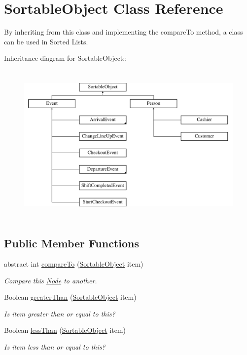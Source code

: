 \hypertarget{class_sortable_object}{
\section{SortableObject Class Reference}
\label{class_sortable_object}
}
By inheriting from this class and implementing the compareTo method, a class can be used in Sorted Lists.  


Inheritance diagram for SortableObject::\begin{figure}[H]
\begin{center}
\leavevmode
\includegraphics[height=8cm]{class_sortable_object}
\end{center}
\end{figure}
\subsection*{Public Member Functions}
\begin{CompactItemize}
\item 
abstract int \hyperlink{class_sortable_object_b8f80361da32c8b04d89116993e60847}{compareTo} (\hyperlink{class_sortable_object}{SortableObject} item)
\begin{CompactList}\small\item\em Compare this \hyperlink{class_node}{Node} to another. \item\end{CompactList}\item 
Boolean \hyperlink{class_sortable_object_b450b5c6e59922086c2b50e033a1d022}{greaterThan} (\hyperlink{class_sortable_object}{SortableObject} item)
\begin{CompactList}\small\item\em Is item greater than or equal to this? \item\end{CompactList}\item 
Boolean \hyperlink{class_sortable_object_24b763b682db416a7cf58713b086c9e0}{lessThan} (\hyperlink{class_sortable_object}{SortableObject} item)
\begin{CompactList}\small\item\em Is item less than or equal to this? \item\end{CompactList}\end{CompactItemize}


